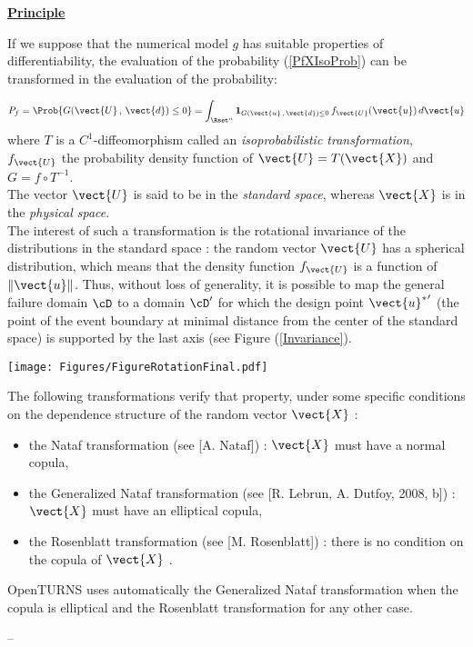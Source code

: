 {  \vspace{2mm}

  \underline{\textbf{Principle}} \vspace{2mm}


  If we suppose that the numerical model $g$ has suitable properties of differentiability, the evaluation of the probability (\ref{PfXIsoProb}) can be transformed in the evaluation of the probability:

  \begin{equation}
    \label{StandardSpace}
    P_f = \Prob{G(\vect{U}\,,\,\vect{d})\leq 0} = \int_{\Rset^n} \boldsymbol{1}_{G(\vect{u}\,,\,\vect{d}) \leq 0}\,f_{\vect{U}}(\vect{u})\,d\vect{u}
  \end{equation}
  where $T$ is a $C^1$-diffeomorphism called an \emph{isoprobabilistic transformation}, $f_{\vect{U}}$ the probability density function of $\vect{U}=T(\vect{X})$ and $G=f\circ T^{-1}$.\\
  The vector $\vect{U}$ is said to be in the \emph{standard space}, whereas $\vect{X}$ is in the \emph{physical space}.\\

  The interest of such a transformation is the rotational invariance of the distributions in the standard space : the random vector $\vect{U}$ has a spherical distribution, which means that the density function $f_{\vect{U}}$ is a function of $\|\vect{u}\|$. Thus, without loss of generality, it is possible to map the general failure domain ${\cD}$ to a domain ${\cD}'$ for which the design point ${\vect{u}^{*}}'$ (the point of the event boundary at minimal distance from the center of the standard space) is supported by the last axis (see Figure (\ref{Invariance}).



  \begin{center}
    \texttt{[image: Figures/FigureRotationFinal.pdf]}
  \end{center}
  \label{Invariance}

  The following transformations verify that property, under some specific conditions on the dependence structure of the random vector $\vect{X}$ :
  \begin{itemize}
  \item the Nataf transformation (see [A. Nataf]) : $\vect{X}$ must have a normal copula,
  \item the Generalized Nataf transformation (see [R. Lebrun, A. Dutfoy, 2008, b]) : $\vect{X}$ must have an elliptical copula,
  \item the Rosenblatt transformation (see [M. Rosenblatt]) : there is no condition on the copula of $\vect{X}$ .
  \end{itemize}

  OpenTURNS uses automatically the Generalized Nataf transformation when the copula is elliptical and the Rosenblatt transformation for any other case.
}
{
  --}

